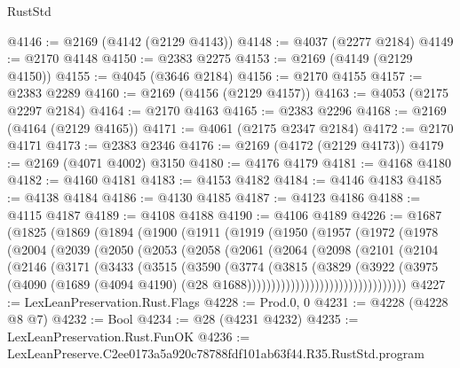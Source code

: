 \begin{lexlean}{RustStd}
\begin{coremodule}
@4146 := @2169 (@4142 (@2129 @4143))
@4148 := @4037 (@2277 @2184)
@4149 := @2170 @4148
@4150 := @2383 @2275
@4153 := @2169 (@4149 (@2129 @4150))
@4155 := @4045 (@3646 @2184)
@4156 := @2170 @4155
@4157 := @2383 @2289
@4160 := @2169 (@4156 (@2129 @4157))
@4163 := @4053 (@2175 @2297 @2184)
@4164 := @2170 @4163
@4165 := @2383 @2296
@4168 := @2169 (@4164 (@2129 @4165))
@4171 := @4061 (@2175 @2347 @2184)
@4172 := @2170 @4171
@4173 := @2383 @2346
@4176 := @2169 (@4172 (@2129 @4173))
@4179 := @2169 (@4071 @4002) @3150
@4180 := @4176 @4179
@4181 := @4168 @4180
@4182 := @4160 @4181
@4183 := @4153 @4182
@4184 := @4146 @4183
@4185 := @4138 @4184
@4186 := @4130 @4185
@4187 := @4123 @4186
@4188 := @4115 @4187
@4189 := @4108 @4188
@4190 := @4106 @4189
@4226 := @1687
    (@1825
      (@1869
        (@1894
          (@1900
            (@1911
              (@1919
                (@1950
                  (@1957
                    (@1972
                      (@1978
                        (@2004
                          (@2039
                            (@2050
                              (@2053
                                (@2058
                                  (@2061
                                    (@2064
                                      (@2098
                                        (@2101
                                          (@2104
                                            (@2146
                                              (@3171
                                                (@3433
                                                  (@3515
                                                    (@3590
                                                      (@3774
                                                        (@3815
                                                          (@3829
                                                            (@3922
                                                              (@3975
                                                                (@4090
                                                                  (@1689
                                                                    (@4094 @4190)
                                                                    (@28
                                                                      @1688)))))))))))))))))))))))))))))))))
@4227 := LexLeanPreservation.Rust.Flags
@4228 := Prod.{0, 0}
@4231 := @4228 (@4228 @8 @7)
@4232 := Bool
@4234 := @28 (@4231 @4232)
@4235 := LexLeanPreservation.Rust.FunOK
@4236 := LexLeanPreserve.C2ee0173a5a920c78788fdf101ab63f44.R35.RustStd.program

\end{coremodule}
\end{lexlean}
